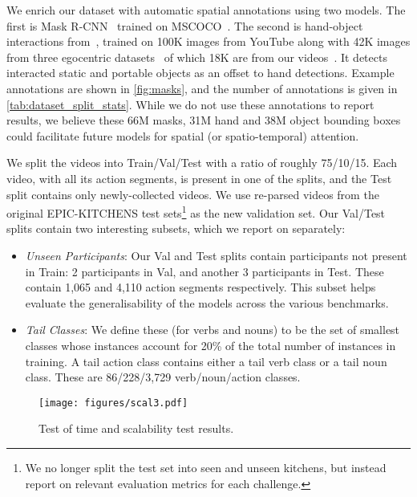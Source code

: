 \RequirePackage{amsmath} \documentclass[runningheads]{llncs}
\newcommand{\chParagraph}[1]{\noindent {\textbf{#1.}} \hspace{6pt}}
\begin{document}
We enrich our dataset with automatic spatial annotations using two models. The first is Mask R-CNN~\cite{he2017mask} trained on MSCOCO~\cite{coco}. The second is hand-object interactions from~\cite{Shan2020Understanding}, trained on 100K images from YouTube along with 42K images from three egocentric datasets~\cite{Damen2018EPICKITCHENS,sigurdsson2018charadesego,EGTEA} of which 18K are from our videos~\cite{Damen2018EPICKITCHENS}. It detects interacted static and portable objects as an offset to hand detections.
Example annotations are shown in
\cref{fig:masks}, and the number of annotations is given in \cref{tab:dataset_split_stats}.
While we do not use these annotations to report results, we believe these 66M masks, 31M hand and 38M object bounding boxes could facilitate future models for spatial (or spatio-temporal) attention.




\chParagraph{Splits}
We split the videos into Train/Val/Test with a ratio of roughly 75/10/15. Each video, with all its action segments, is present in one of the splits, and the  
Test split contains only newly-collected videos.
We use re-parsed videos from the original EPIC-KITCHENS test sets\footnote{We no longer split the test set into seen and unseen kitchens, but instead report on relevant evaluation metrics for each challenge.} as the new validation set.
Our Val/Test splits contain two interesting subsets, which we report on separately:
\begin{itemize}[leftmargin=*,itemsep=-2ex,partopsep=1ex,parsep=2ex]
    \item \emph{Unseen Participants}: Our Val and Test splits contain participants not present in Train: 2 participants in Val, and another 3 participants in Test. These contain 1,065 and 4,110 action segments respectively.
    This subset helps evaluate the generalisability of the models across the various benchmarks.
    \item \emph{Tail Classes}: We define these (for verbs and nouns) to be the set of smallest classes whose instances account for 20\% of the total number of instances in training.
A tail action class contains either a tail verb class or a tail noun class.
These are 86/228/3,729 verb/noun/action classes. 

\end{itemize}

\begin{figure}[t]
    \begin{center}
    \texttt{[image: figures/scal3.pdf]}
\caption{Test of time and scalability test results.}
    \label{fig:scalability}
    \end{center}
\end{figure}
\end{document}
